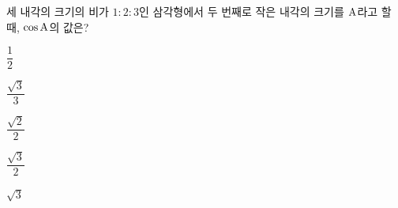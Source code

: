 세 내각의 크기의 비가 $1:2:3$인 삼각형에서 두 번째로 작은 내각의 크기를 $\mathrm{A}$라고 할 때, $\cos\mathrm{A}$의 값은?
\begin{choices32}{\rule[-3ex]{0pt}{8ex}$\dfrac{1}{2}$}{\rule[-3ex]{0pt}{8ex}$\dfrac{\sqrt{3}}{3}$}{\rule[-3ex]{0pt}{8ex}$\dfrac{\sqrt{2}}{2}$}{\rule[-3ex]{0pt}{8ex}$\dfrac{\sqrt{3}}{2}$}{\rule[-3ex]{0pt}{8ex}$\sqrt{3}$}\end{choices32}
